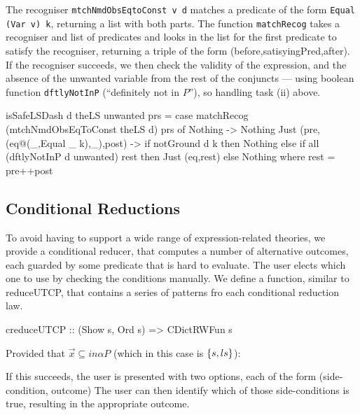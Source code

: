 The recogniser \texttt{mtchNmdObsEqtoConst v d} matches a predicate of the form
\texttt{Equal (Var v) k}, returning a list with both parts.
The function \texttt{matchRecog} takes a recogniser and list of predicates
and looks in the list for the first predicate to satisfy
the recogniser, returning a triple of the form
(before,satisyingPred,after).
If the recogniser succeeds,
we then check the validity of the expression,
and the absence of the unwanted variable from the
rest of the conjuncts --- using boolean function
 \texttt{dftlyNotInP} (``definitely not in $P$''),
 so handling task (ii) above.
\begin{code}
isSafeLSDash d theLS unwanted prs
 = case matchRecog (mtchNmdObsEqToConst theLS d) prs of
    Nothing -> Nothing
    Just (pre,(eq@(_,Equal _ k),_),post) ->
     if notGround d k
      then Nothing
      else if all (dftlyNotInP d unwanted) rest
       then Just (eq,rest)
       else Nothing
     where rest = pre++post
\end{code}

\subsection{Conditional Reductions}

To avoid having to support a wide range of expression-related theories,
we provide a conditional reducer, that computes
a number of alternative outcomes, each guarded by some predicate
that is hard to evaluate.
The user elects which one to use by checking the conditions manually.
We define a function, similar to reduceUTCP,
that contains a series of patterns fro each conditional reduction law.
\begin{code}
creduceUTCP :: (Show s, Ord s) => CDictRWFun s
\end{code}
Provided that $\vec x \subseteq in\alpha P$
 (which in this case is $\{{s,ls}\}$):
If this succeeds, the user is presented with two options,
each of the form (side-condition, outcome)
The user can then identify which of those side-conditions is true,
resulting in the appropriate outcome.

